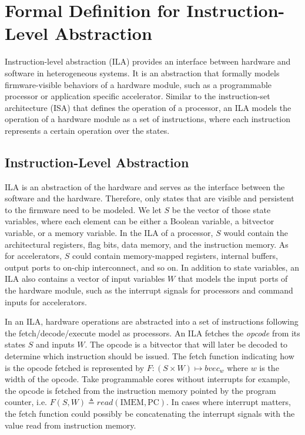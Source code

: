 \newcommand{\bd}[0]{\mathbb{B}}
\newcommand{\st}[1]{\mathrm{#1}}
\newcommand{\ft}[1]{\mathtt{#1}}

\section*{Formal Definition for Instruction-Level Abstraction}

Instruction-level abstraction (ILA) provides an interface between hardware and 
software in heterogeneous systems.
It is an abstraction that formally models firmware-visible behaviors of a hardware
module, such as a programmable processor or application specific accelerator.
Similar to the instruction-set architecture (ISA) that defines the operation of
a processor, an ILA models the operation of a hardware module as a set of 
instructions, where each instruction represents a certain operation over the 
states.

\subsection*{Instruction-Level Abstraction}
ILA is an abstraction of the hardware and serves as the interface between the 
software and the hardware. 
Therefore, only states that are visible and persistent to the firmware need to 
be modeled.
We let $S$ be the vector of those state variables, where each element can be 
either a Boolean variable, a bitvector variable, or a memory variable.
In the ILA of a processor, $S$ would contain the architectural registers, flag
bits, data memory, and the instruction memory.
As for accelerators, $S$ could contain memory-mapped registers, internal buffers, 
output ports to on-chip interconnect, and so on.
In addition to state variables, an ILA also contains a vector of input variables
$W$ that models the input ports of the hardware module, such as the interrupt 
signals for processors and command inputs for accelerators.

In an ILA, hardware operations are abstracted into a set of instructions 
following the fetch/decode/execute model as processors.
%
An ILA fetches the \textit{opcode} from its states $S$ and inputs $W$.
The opcode is a bitvector that will later be decoded to determine which 
instruction should be issued.
The fetch function indicating how is the opcode fetched is represented by 
$F : (S \times W) \mapsto bvec_w$ where $w$ is the width of the opcode.
Take programmable cores without interrupts for example, the opcode is fetched 
from the instruction memory pointed by the program counter, i.e. 
$F(S, W) \triangleq read( \st{IMEM}, \st{PC} )$.
In cases where interrupt matters, the fetch function could possibly be 
concatenating the interrupt signals with the value read from instruction memory.

